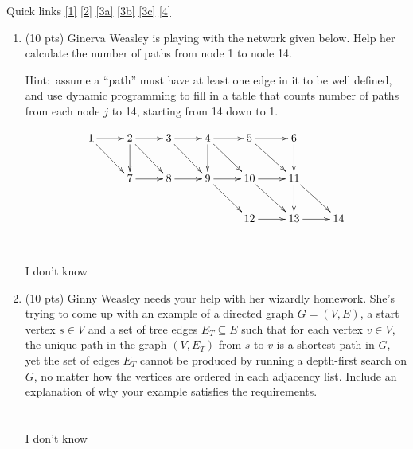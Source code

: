 \documentclass[12pt]{article}
\begin{document}
\renewcommand{\headrulewidth}{0.5pt}
\phantom{Test}

Quick links \ref{1} \ref{2} \ref{3a} \ref{3b} \ref{3c} \ref{4}


\vspace{-3mm}

\begin{enumerate}


\item \label{1} (10 pts) Ginerva Weasley is playing with the network given below. Help
her calculate the number of paths from node 1 to node 14.
	
Hint:\ assume a ``path'' must have at least one edge in it to be well defined,
and use dynamic programming to fill in a table that counts number of
paths from each node $j$ to 14, starting from 14 down to 1.

\[
\xymatrix{
1 \cir{} \ar[r] \ar[dr] & 2 \ar[r] \ar[dr] \ar[d] & 3 \ar[r] \ar[dr]  & 4 \ar[r] \ar[dr] \ar[d] & 5 \ar[r] \ar[dr]  & 6 \ar[d] \\
& 7 \ar[r] & 8 \ar[r] & 9 \ar[r] \ar[dr] & 10 \ar[r] \ar[dr] & 11 \ar[dr] \ar[d] \\ 
&    &    &    & 12 \ar[r] & 13 \ar[r] & 14
}
\]
\\ \\ I don't know
\pagebreak

\item \label{2} (10 pts) Ginny Weasley needs your help with her wizardly homework. She's
trying to come up with an example of a directed graph $G=(V, E)$, a start
vertex $s \in V$ and a set of tree edges $E_{T} \subseteq E$ such that
for each vertex $v \in V$, the unique path in the graph $(V,E_{T})$
from $s$ to $v$ is a shortest path in $G$, yet the set of edges $E_{T}$
cannot be produced by running a depth-first search on $G$, no matter
how the vertices are ordered in each adjacency list. Include an
explanation of why your example satisfies the requirements.\\
\\ \\ I don't know
\pagebreak



\end{enumerate}
\end{document}
